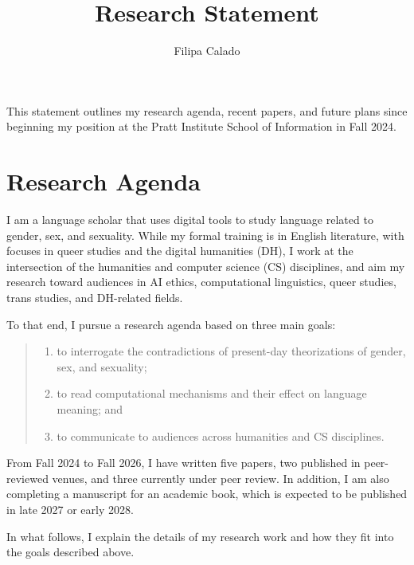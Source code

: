 \documentclass[12pt]{article}
\author{Filipa Calado}
\date{}
\title{Research Statement}
\makeatletter
\renewcommand{\maketitle}{%
\begin{center}
{\LARGE\@title\par}
\vspace{0.5em}
{\large\@author\par}
\vspace{0.5em}
{\large\@date\par}
\end{center}
}
\makeatother
\begin{document}
\maketitle
This statement outlines my research agenda, recent papers, and future
plans since beginning my position at the Pratt Institute School of
Information in Fall 2024.

\section*{Research Agenda}
\label{sec:org47f9443}
I am a language scholar that uses digital tools to study language
related to gender, sex, and sexuality. While my formal training is in
English literature, with focuses in queer studies and the digital
humanities (DH), I work at the intersection of the humanities and
computer science (CS) disciplines, and aim my research toward
audiences in AI ethics, computational linguistics, queer studies,
trans studies, and DH-related fields.

To that end, I pursue a research agenda based on three main goals:
\begin{quote}
\begin{enumerate}
\item to interrogate the contradictions of present-day theorizations of
gender, sex, and sexuality;

\item to read computational mechanisms and their effect on language
meaning; and

\item to communicate to audiences across humanities and CS disciplines.
\end{enumerate}
\end{quote}

From Fall 2024 to Fall 2026, I have written five papers, two published
in peer-reviewed venues, and three currently under peer review. In
addition, I am also completing a manuscript for an academic book,
which is expected to be published in late 2027 or early 2028. 

In what follows, I explain the details of my research work and how
they fit into the goals described above.
\end{document}
